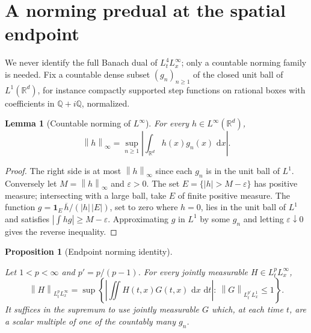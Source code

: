 \documentclass[11pt,oneside]{book}
\providecommand{\uses}[1]{}
\newtheorem{proposition}[theorem]{Proposition}
\newtheorem{lemma}[theorem]{Lemma}
\theoremstyle{definition}
\theoremstyle{remark}
\newcommand{\R}{\mathbb R}
\newcommand{\Q}{\mathbb Q}
\newcommand{\1}{\mathbf 1}
\newcommand{\dd}{\,\mathrm d}
\newcommand{\norm}[1]{\left\lVert #1\right\rVert}
\newcommand{\abs}[1]{\left\lvert #1\right\rvert}
\newcommand{\eps}{\varepsilon}
\begin{document}
\section{A norming predual at the spatial endpoint}

We never identify the full Banach dual of $L^4_tL^\infty_x$; only a countable norming family is needed. Fix a countable dense subset $(g_n)_{n\ge1}$ of the closed unit ball of $L^1(\R^d)$, for instance compactly supported step functions on rational boxes with coefficients in $\Q+i\Q$, normalized.

\begin{lemma}[Countable norming of $L^\infty$]\label{lem:countable-norming-Linfty}
For every $h\in L^\infty(\R^d)$,
\begin{equation}
 \norm{h}_\infty=\sup_{n\ge1}\left|\int_{\R^d}h(x)g_n(x)\,\dd x\right|.
 \label{eq:countable-norming-Linfty}
\end{equation}
\end{lemma}

\begin{proof}
\uses{}
The right side is at most $\norm{h}_\infty$ since each $g_n$ is in the unit ball of $L^1$. Conversely let $M=\norm{h}_\infty$ and $\eps>0$. The set $E=\{\abs{h}>M-\eps\}$ has positive measure; intersecting with a large ball, take $E$ of finite positive measure. The function $g=\1_E\,\overline{h}/(\abs{h}\,\abs{E})$, set to zero where $h=0$, lies in the unit ball of $L^1$ and satisfies $\abs{\int hg}\ge M-\eps$. Approximating $g$ in $L^1$ by some $g_n$ and letting $\eps\downarrow0$ gives the reverse inequality.
\end{proof}

\begin{proposition}[Endpoint norming identity]\label{prop:endpoint-norming}
\uses{def:scalar-mixed-norm, lem:countable-norming-Linfty}
Let $1<p<\infty$ and $p'=p/(p-1)$. For every jointly measurable $H\in L^p_tL^\infty_x$,
\begin{equation}
 \norm{H}_{L^p_tL^\infty_x}
 =\sup\left\{\left|\iint H(t,x)G(t,x)\,\dd x\,\dd t\right|:\ \norm{G}_{L^{p'}_tL^1_x}\le1\right\}.
 \label{eq:endpoint-norming}
\end{equation}
It suffices in the supremum to use jointly measurable $G$ which, at each time $t$, are a scalar multiple of one of the countably many $g_n$.
\end{proposition}
\end{document}

